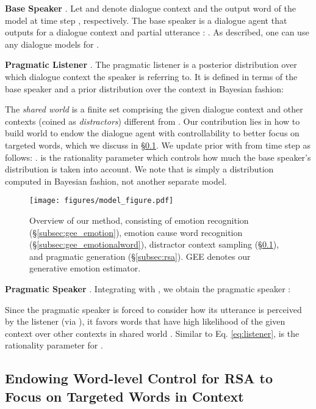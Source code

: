 \documentclass[11pt]{article}
\begin{document}
\textbf{Base Speaker }.
Let  and  denote dialogue context and the output word of the model at time step , respectively.
The base speaker  is a dialogue agent that outputs  for a dialogue context and partial utterance : .
As described, one can use any dialogue models for .

\textbf{Pragmatic Listener }.
The pragmatic listener is a posterior distribution over which dialogue context the speaker is referring to.
It is defined in terms of the base speaker  and a prior distribution  over the context in Bayesian fashion:

The \textit{shared world}  is a finite set comprising the given dialogue context  and other contexts (coined as \textit{distractors}) different from .
Our contribution lies in how to build world  to endow the dialogue agent with controllability to better focus on targeted words, which we discuss in \S \ref{subsec:world}.
We update prior  with  from time step  as follows: .
 is the rationality parameter which controls how much the base speaker's distribution is taken into account.
We note that  is simply a distribution computed in Bayesian fashion, not another separate model.



\begin{figure}[t] \begin{center}
    \vspace{-5pt}
\texttt{[image: figures/model\_figure.pdf]}
    \caption{Overview of our method, consisting of emotion recognition (\S \ref{subsec:gee_emotion}),
        emotion cause word recognition (\S \ref{subsec:gee_emotionalword}),
        distractor context sampling (\S \ref{subsec:world}), and pragmatic generation (\S \ref{subsec:rsa}).
        GEE denotes our generative emotion estimator.}
    \label{fig:model}
    \vspace{-10pt}
\end{center} \end{figure}


\textbf{Pragmatic Speaker }.
Integrating  with , we obtain the pragmatic speaker :

Since the pragmatic speaker  is forced to consider how its utterance is perceived by the listener (via ),
it favors words that have high likelihood of the given context  over other contexts in shared world .
Similar to Eq. \ref{eq:listener},  is the rationality parameter for .


\subsection{Endowing Word-level Control for RSA \newline to Focus on Targeted Words in Context}
\label{subsec:world}
\end{document}

